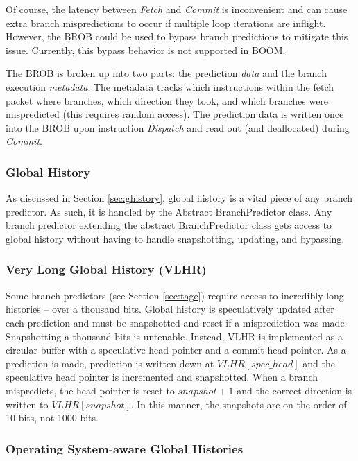 Of course, the latency between {\em Fetch} and {\em Commit} is inconvenient and can cause extra branch mispredictions to occur if multiple loop iterations are inflight. However, the BROB could be used to bypass branch predictions to mitigate this issue. Currently, this bypass behavior is not supported in BOOM.

The BROB is broken up into two parts: the prediction {\em data} and the branch execution {\em metadata}.  The metadata tracks which instructions within the fetch packet where branches, which direction they took, and which branches were mispredicted (this requires random access). The prediction data is written once into the BROB upon instruction {\em Dispatch} and read out (and deallocated) during {\em Commit}.


\subsubsection{Global History}

As discussed in Section \ref{sec:ghistory}, global history is a vital piece of any branch predictor.  As such, it is handled by the Abstract BranchPredictor class.  Any branch predictor extending the abstract BranchPredictor class gets access to global history without having to handle  snapshotting, updating, and bypassing.

\subsubsection{Very Long Global History (VLHR)}

Some branch predictors (see Section \ref{sec:tage}) require access to incredibly long histories -- over a thousand bits.  Global history is speculatively updated after each prediction and must be snapshotted and reset if a misprediction was made. Snapshotting a thousand bits is untenable.  Instead, VLHR is implemented as a circular buffer with a speculative head pointer and a commit head pointer.  As a prediction is made, prediction is written down at $VLHR[spec\_head]$ and the speculative head pointer is incremented and snapshotted. When a branch mispredicts, the head pointer is reset to $snapshot+1$ and the correct direction is written to $VLHR[snapshot]$.  In this manner, the snapshots are on the order of 10 bits, not 1000 bits.


\subsubsection{Operating System-aware Global Histories}

